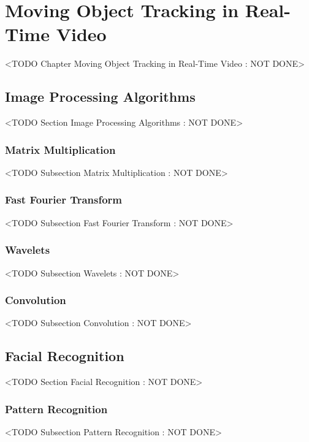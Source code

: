 \chapter{Moving Object Tracking in Real-Time Video}
	<TODO Chapter Moving Object Tracking in Real-Time Video : NOT DONE>

\section{Image Processing Algorithms}
	<TODO Section Image Processing Algorithms : NOT DONE>

\subsection{Matrix Multiplication}
	<TODO Subsection Matrix Multiplication : NOT DONE>

\subsection{Fast Fourier Transform}
	<TODO Subsection Fast Fourier Transform : NOT DONE>

\subsection{Wavelets}
	<TODO Subsection Wavelets : NOT DONE>

\subsection{Convolution}
	<TODO Subsection Convolution : NOT DONE>

\section{Facial Recognition}
	<TODO Section Facial Recognition : NOT DONE>

\subsection{Pattern Recognition}
	<TODO Subsection Pattern Recognition : NOT DONE>


